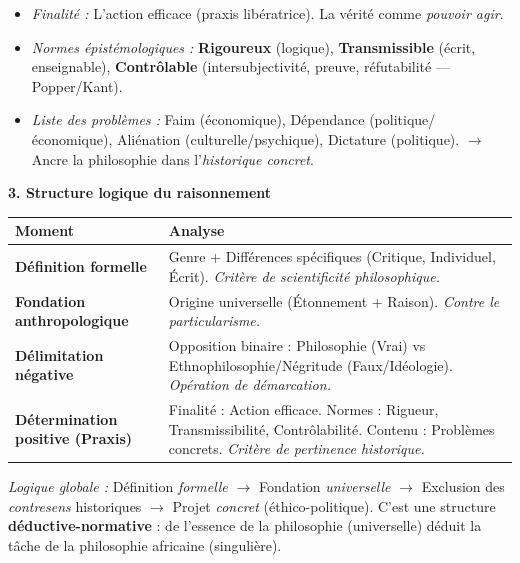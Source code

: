 \documentclass[11pt]{article}
\begin{document}
\begin{corrige}
\begin{enumerate}
\begin{itemize}
\item \emph{Finalité :} L'action efficace (praxis libératrice). La vérité comme \emph{pouvoir agir}.
\item \emph{Normes épistémologiques :} \textbf{Rigoureux} (logique), \textbf{Transmissible} (écrit, enseignable), \textbf{Contrôlable} (intersubjectivité, preuve, réfutabilité — Popper/Kant).
\item \emph{Liste des problèmes :} Faim (économique), Dépendance (politique/économique), Aliénation (culturelle/psychique), Dictature (politique). $\rightarrow$ Ancre la philosophie dans l'\emph{historique concret}.
\end{itemize}
\end{enumerate}

\textbf{3. Structure logique du raisonnement}
\begin{center}
\begin{tabularx}{\linewidth}{|l|X|}
\hline
\rowcolor{popblueL}
\textbf{Moment} & \textbf{Analyse} \\
\hline
\textbf{Définition formelle} & Genre + Différences spécifiques (Critique, Individuel, Écrit). \emph{Critère de scientificité philosophique.} \\
\hline
\textbf{Fondation anthropologique} & Origine universelle (Étonnement + Raison). \emph{Contre le particularisme.} \\
\hline
\textbf{Délimitation négative} & Opposition binaire : Philosophie (Vrai) vs Ethnophilosophie/Négritude (Faux/Idéologie). \emph{Opération de démarcation.} \\
\hline
\textbf{Détermination positive (Praxis)} & Finalité : Action efficace. Normes : Rigueur, Transmissibilité, Contrôlabilité. Contenu : Problèmes concrets. \emph{Critère de pertinence historique.} \\
\hline
\end{tabularx}
\end{center}
\textit{Logique globale :} Définition \emph{formelle} $\rightarrow$ Fondation \emph{universelle} $\rightarrow$ Exclusion des \emph{contresens} historiques $\rightarrow$ Projet \emph{concret} (éthico-politique). C'est une structure \textbf{déductive-normative} : de l'essence de la philosophie (universelle) déduit la tâche de la philosophie africaine (singulière).


\end{corrige}
\end{document}
